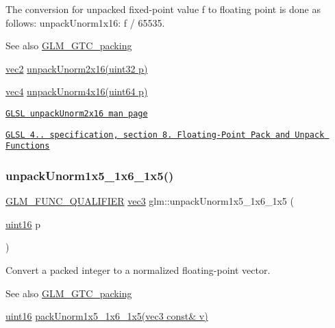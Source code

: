 The conversion for unpacked fixed-\/point value f to floating point is done as follows\+: unpack\+Unorm1x16\+: f / 65535.

\begin{DoxySeeAlso}{See also}
\hyperlink{group__gtc__packing}{G\+L\+M\+\_\+\+G\+T\+C\+\_\+packing} 

\hyperlink{group__core__types_gaa1618f51db67eaa145db101d8c8431d8}{vec2} \hyperlink{group__core__func__packing_ga1f66188e5d65afeb9ffba1ad971e4007}{unpack\+Unorm2x16(uint32 p)} 

\hyperlink{group__core__types_ga5881b1b022d7fd1b7218f5916532dd02}{vec4} \hyperlink{group__gtc__packing_gafb2b502bc406031a5618ce930139a9e3}{unpack\+Unorm4x16(uint64 p)} 

\href{http://www.opengl.org/sdk/docs/manglsl/xhtml/unpackUnorm2x16.xml}{\tt G\+L\+SL unpack\+Unorm2x16 man page} 

\href{http://www.opengl.org/registry/doc/GLSLangSpec.4.20.8.pdf}{\tt G\+L\+SL 4.. specification, section 8. Floating-\/\+Point Pack and Unpack Functions} 
\end{DoxySeeAlso}
\mbox{\label{group__gtc__packing_ga6804d0525daf68bcac226f46fbb3b24e}} 
\subsubsection{\texorpdfstring{unpack\+Unorm1x5\+\_\+1x6\+\_\+1x5()}{unpackUnorm1x5\_1x6\_1x5()}}
{\footnotesize\ttfamily \hyperlink{setup_8hpp_a33fdea6f91c5f834105f7415e2a64407}{G\+L\+M\+\_\+\+F\+U\+N\+C\+\_\+\+Q\+U\+A\+L\+I\+F\+I\+ER} \hyperlink{group__core__types_ga1c47e8b3386109bc992b6c48e91b0be7}{vec3} glm\+::unpack\+Unorm1x5\+\_\+1x6\+\_\+1x5 (\begin{DoxyParamCaption}\item[{\hyperlink{group__gtc__type__precision_gad8c2939e1fdd8e5828b31d95c52255d5}{uint16}}]{p }\end{DoxyParamCaption})}

Convert a packed integer to a normalized floating-\/point vector.

\begin{DoxySeeAlso}{See also}
\hyperlink{group__gtc__packing}{G\+L\+M\+\_\+\+G\+T\+C\+\_\+packing} 

\hyperlink{group__gtc__type__precision_gad8c2939e1fdd8e5828b31d95c52255d5}{uint16} \hyperlink{group__gtc__packing_ga0fcb493167d540aca105d11df5c55503}{pack\+Unorm1x5\+\_\+1x6\+\_\+1x5(vec3 const\& v)} 
\end{DoxySeeAlso}
\mbox{\label{group__gtc__packing_ga32f3f2642df2ea87449d59fb614a8305}} 
